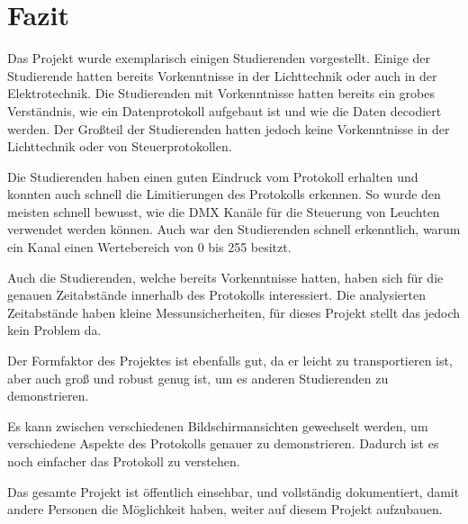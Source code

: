 \chapter{Fazit}

Das Projekt wurde exemplarisch einigen Studierenden vorgestellt. Einige der Studierende hatten bereits Vorkenntnisse in der Lichttechnik oder auch in der Elektrotechnik. Die Studierenden mit Vorkenntnisse hatten bereits ein grobes Verständnis, wie ein Datenprotokoll aufgebaut ist und wie die Daten decodiert werden. Der Großteil der Studierenden hatten jedoch keine Vorkenntnisse in der Lichttechnik oder von Steuerprotokollen.

Die Studierenden haben einen guten Eindruck vom Protokoll erhalten und konnten auch schnell die Limitierungen des Protokolls erkennen. So wurde den meisten schnell bewusst, wie die DMX Kanäle für die Steuerung von Leuchten verwendet werden können. Auch war den Studierenden schnell erkenntlich, warum ein Kanal einen Wertebereich von 0 bis 255 besitzt.

Auch die Studierenden, welche bereits Vorkenntnisse hatten, haben sich für die genauen Zeitabstände innerhalb des Protokolls interessiert. Die analysierten Zeitabstände haben kleine Messunsicherheiten, für dieses Projekt stellt das jedoch kein Problem da.

Der Formfaktor des Projektes ist ebenfalls gut, da er leicht zu transportieren ist, aber auch groß und robust genug ist, um es anderen Studierenden zu demonstrieren.

Es kann zwischen verschiedenen Bildschirmansichten gewechselt werden, um verschiedene Aspekte des Protokolls genauer zu demonstrieren. Dadurch ist es noch einfacher das Protokoll zu verstehen.

Das gesamte Projekt ist öffentlich \cite{githubDmxAnalyzer} einsehbar, und vollständig dokumentiert, damit andere Personen die Möglichkeit haben, weiter auf diesem Projekt aufzubauen.

